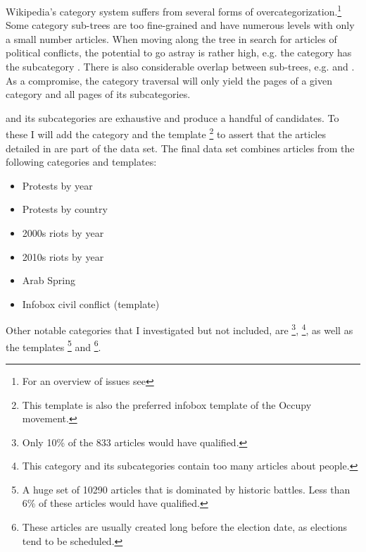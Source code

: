 Wikipedia's category system suffers from several forms of overcategorization.\footnote{For an overview of issues see } 
Some category sub-trees are too fine-grained and have numerous  levels with only a small number articles.
When moving along the tree in search for articles of political conflicts, the potential to go astray is rather high, e.g. the category  has the subcategory .
There is also considerable overlap between sub-trees, e.g.  and .
As a compromise, the category traversal will only yield the pages of a given category and all pages of its subcategories.

 and its subcategories are exhaustive and produce a handful of candidates.
To these I will add the category  and the template \footnote{This template is also the preferred infobox template of the Occupy movement. } to assert that the articles detailed in  are part of the data set.
The final data set  combines articles from the following categories and templates:

\begin{itemize}
  \item Protests by year %
  \item Protests by country
  \item 2000s riots by year
  \item 2010s riots by year
  \item Arab Spring
  \item Infobox civil conflict (template)
\end{itemize}

Other notable categories that I investigated but not included, are 
\footnote{Only 10\% of the 833 articles would have qualified. }, 
\footnote{This category and its subcategories contain too many articles about people. }, as well as the templates 
\footnote{A huge set of 10290 articles that is dominated by historic battles. Less than 6\% of these articles would have qualified. } and 
\footnote{These articles are usually created long before the election date, as elections tend to be scheduled. }.


